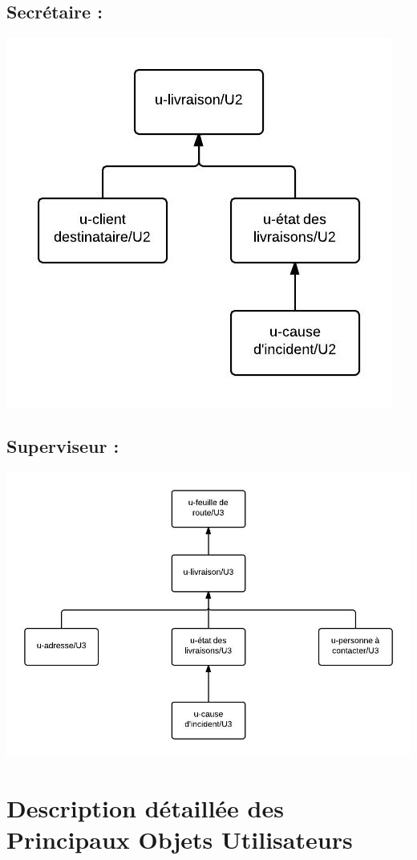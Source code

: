 \documentclass{report}
\begin{document}
\subsection{Secrétaire : }
\includegraphics[scale = 0.4]{images/MSIHM-U2.jpeg}

\subsection{Superviseur  : }
\includegraphics[scale = 0.4]{images/MSIHM-U3.jpeg}

\section{Description détaillée des Principaux Objets Utilisateurs}
\end{document}
